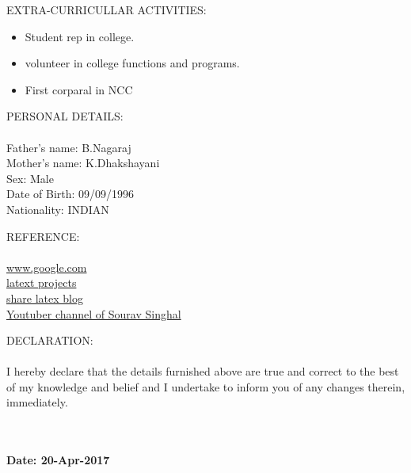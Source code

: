 \documentclass[14pt,a4paper]{article}
\begin{document}
\begin{paragraph}{\large EXTRA-CURRICULLAR ACTIVITIES:\\}
\begin{itemize}
\item Student rep in college.
\item volunteer in college functions and programs.
\item First corparal in NCC
\end{itemize}
\end{paragraph}

\begin{paragraph}{\large PERSONAL DETAILS: \\}
\hfill\\
Father's name: B.Nagaraj\\
Mother's name: K.Dhakshayani\\
Sex: Male\\
Date of Birth: 09/09/1996\\
Nationality: INDIAN\\
\end{paragraph}

\begin{paragraph}{\large REFERENCE:\\}
\hfill\\
\href{www.google.com}{www.google.com\\}
\href{http://www.latex-project.org/}{latext projects\\}
\href{https://www.sharelatex.com/learn/Multiple_columns}{share latex blog\\}
\href{https://www.youtube.com/channel/UC7Bbc2pxojIxRglXbm_mC2g}{Youtuber channel of Sourav Singhal\\}
\end{paragraph}

\begin{paragraph}{\large DECLARATION:\\}
\hfill\\
 I hereby declare that the details furnished above are true and correct to the best of my knowledge
and belief and I undertake to inform you of any changes therein, immediately.\\
\end{paragraph}
\hfill\\
\hfill\\
\textbf{\large Date: 20-Apr-2017\\}
\end{document}
